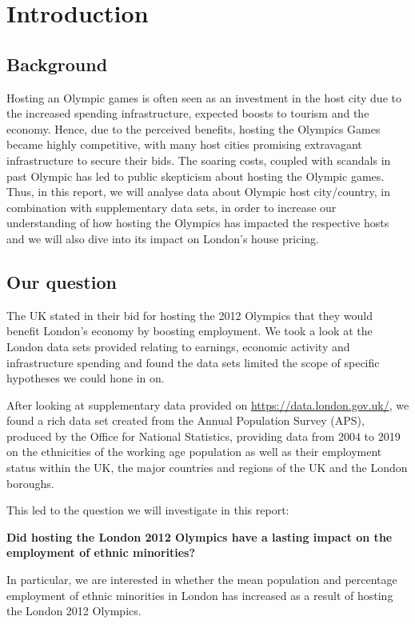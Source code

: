 \documentclass[12pt,twoside]{article}
\begin{document}




\section{Introduction}
\subsection{Background}
Hosting an Olympic games is often seen as an investment in the host city due to the increased spending infrastructure, expected boosts to tourism and the economy. Hence, due to the perceived benefits, hosting the Olympics Games became highly competitive, with many host cities promising extravagant infrastructure to secure their bids. The soaring costs, coupled with scandals in past Olympic has led to public skepticism about hosting the Olympic games. Thus, in this report, we will analyse data about Olympic host city/country, in combination with supplementary data sets, in order to increase our understanding of how hosting the Olympics has impacted the respective hosts and we will also dive into its impact on London's house pricing.\par
\subsection{Our question}
The UK stated in their bid for hosting the 2012 Olympics that they would benefit London's economy by boosting employment. We took a look at the London data sets provided relating to earnings, economic activity and infrastructure spending and found the data sets limited the scope of specific hypotheses we could hone in on.\par
After looking at supplementary data provided on \mbox{\url{https://data.london.gov.uk/}}, we found a rich data set created from the Annual Population Survey (APS), produced by the Office for National Statistics, providing data from 2004 to 2019 on the ethnicities of the working age population as well as their employment status within the UK, the major countries and regions of the UK and the London boroughs.\par
This led to the question we will investigate in this report:
\begin{displayquote}
\textbf{Did hosting the London 2012 Olympics have a lasting impact on the employment of ethnic minorities?}
\end{displayquote}
In particular, we are interested in whether the mean population and percentage employment of ethnic minorities in London has increased as a result of hosting the London 2012 Olympics.
\raggedbottom
\end{document}
